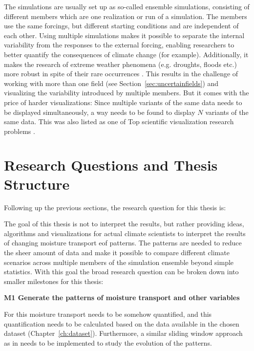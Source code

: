 The simulations are usually set up as so-called ensemble simulations, consisting of different members which are one realization or run of a simulation. 
The members use the same forcings, but different starting conditions and are independent of each other. 
Using multiple simulations makes it possible to separate the internal variability from the responses to the external forcing, enabling researchers to better quantify the consequences of climate change (for example). 
Additionally, it makes the research of extreme weather phenomena (e.g. droughts, floods etc.) more robust in spite of their rare occurrences \cite{maher_large_2021}.
This results in the challenge of working with more than one field (see Section~\ref{sec:uncertainfields}) and visualizing the variability introduced by multiple members. 
But it comes with the price of harder visualizations: Since multiple variants of the same data needs to be displayed simultaneously, a way needs to be found to display $N$ variants of the same data. 
This was also listed as one of Top scientific visualization research problems \cite{johnson_top_2004}. 


\section{Research Questions and Thesis Structure}
\label{sec:research_questions}

Following up the previous sections, the research question for this thesis is: 

\begin{center}
\end{center}

The goal of this thesis is not to interpret the results, but rather providing ideas, algorithms and visualizations for actual climate scientists to interpret the results of changing moisture transport \ac{eof} patterns. 
The patterns are needed to reduce the sheer amount of data and make it possible to compare different climate scenarios across multiple members of the simulation ensemble beyond simple statistics.
With this goal the broad research question can be broken down into smaller milestones for this thesis: 

\textbf{M1 Generate the patterns of moisture transport and other variables}

For this moisture transport needs to be somehow quantified, and this quantification needs to be calculated based on the data available in the chosen dataset (Chapter~\ref{ch:dataset}). 
Furthermore, a similar sliding window approach as in \cite{vietinghoff_visual_2021} needs to be implemented to study the evolution of the patterns.

